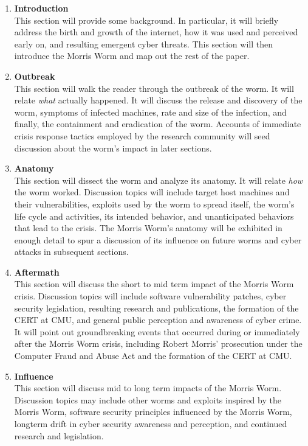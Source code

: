 
\begin{enumerate}
\item \textbf{Introduction} \\
This section will provide some background. In particular, it will briefly address the birth and growth of the internet, how it was used and perceived early on, and resulting emergent cyber threats. This section will then introduce the Morris Worm and map out the rest of the paper. 

\item \textbf{Outbreak} \\
This section will walk the reader through the outbreak of the worm. It will relate \textit{what} actually happened. It will discuss the release and discovery of the worm, symptoms of infected machines, rate and size of the infection, and finally, the containment and eradication of the worm. Accounts of immediate crisis response tactics employed by the research community will seed discussion about the worm's impact in later sections. 

\item \textbf{Anatomy} \\
This section will dissect the worm and analyze its anatomy. It will relate \textit{how} the worm worked. Discussion topics will include target host machines and their vulnerabilities, exploits used by the worm to spread itself, the worm's life cycle and activities, its intended behavior, and unanticipated behaviors that lead to the crisis. The Morris Worm's anatomy will be exhibited in enough detail to spur a discussion of its influence on future worms and cyber attacks in subsequent sections.
  
\item \textbf{Aftermath} \\
This section will discuss the short to mid term impact of the Morris Worm crisis. Discussion topics will include software vulnerability patches, cyber security legislation, resulting research and publications, the formation of the CERT at CMU, and general public perception and awareness of cyber crime. It will point out groundbreaking events that occurred during or immediately after the Morris Worm crisis, including Robert Morris' prosecution under the Computer Fraud and Abuse Act and the formation of the CERT at CMU.

\item \textbf{Influence} \\
This section will discuss mid to long term impacts of the Morris Worm. Discussion topics may include other worms and exploits inspired by the Morris Worm, software security principles influenced by the Morris Worm, longterm drift in cyber security awareness and perception, and continued research and legislation.   


\end{enumerate}

